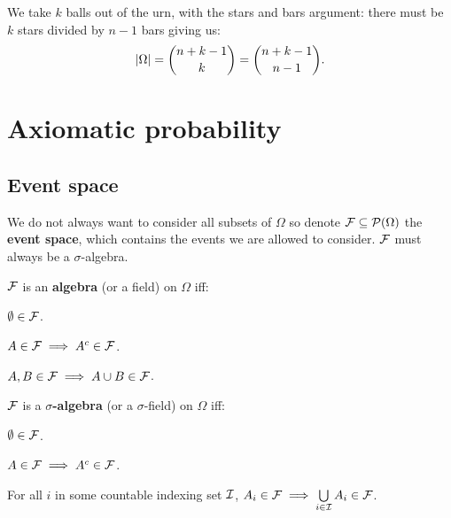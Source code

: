 \begingroup\belowdisplayskip=-10pt
    \begin{definition}
        We take $k$ balls out of the urn, with the stars and bars argument: there must be $k$ stars divided by $n-1$ bars giving us:
        \[
        |\Omega| = \binom{n+k-1}{k} = \binom{n+k-1}{n-1}\textcolor{black}{.}
        \]
    \end{definition}
\endgroup

\section{Axiomatic probability}
\subsection{Event space}
We do not always want to consider all subsets of $\Omega$ so denote $\mathcal{F} \subseteq \mathcal{P}(\Omega)$ the \textbf{event space}, which contains the events we are allowed to consider. $\mathcal{F}$ must always be a $\sigma$-algebra.

\begin{definition}[Algebra]
    $\mathcal{F}$ is an \textbf{algebra} (or a field) on $\Omega$ iff:\\
    \begin{enumerate*}
        \item $\emptyset \in \mathcal{F}$. \hspace{100pt}
        \item $A \in \mathcal{F} \implies A^c \in \mathcal{F}$. \hspace{100pt}
        \item $A,B \in \mathcal{F} \implies A\cup B \in \mathcal{F}$.
    \end{enumerate*}
\end{definition}

\begin{definition}
    $\mathcal{F}$ is a \textbf{$\sigma$-algebra} (or a $\sigma$-field) on $\Omega$ iff:\\
    \begin{enumerate*}
        \item $\emptyset \in \mathcal{F}$. \hspace{15pt}
        \item $A \in \mathcal{F} \implies A^c \in \mathcal{F}$. \hspace{15pt}
        \item For all $i$ in some countable indexing set $\mathcal{I}$, $A_i \in \mathcal{F} \implies \bigcup\limits_{i\in \mathcal{I}}A_i \in \mathcal{F}$.
    \end{enumerate*}
\end{definition}

